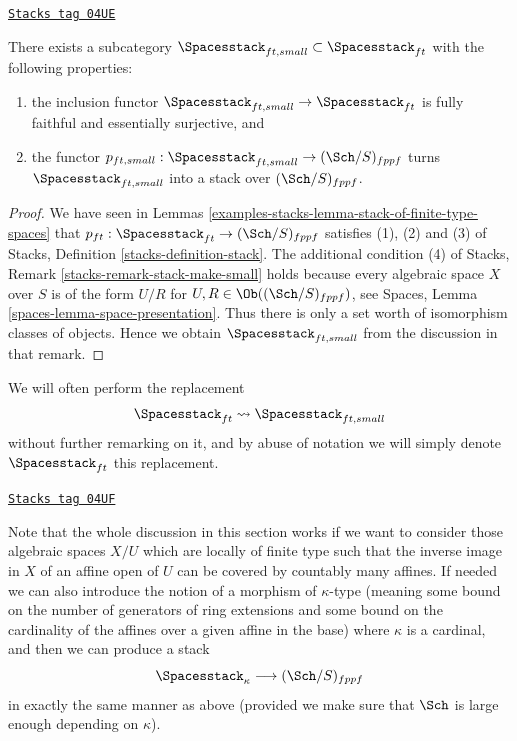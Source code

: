 \begin{lemma}
\label{examples-stacks-lemma-stack-ft-spaces}
\href{https://stacks.math.columbia.edu/tag/04UE}{\texttt{Stacks tag 04UE}}

There exists a subcategory
$\Spacesstack_{ft, small} \subset \Spacesstack_{ft}$
with the following properties:
\begin{enumerate}
\item the inclusion functor
$\Spacesstack_{ft, small} \to \Spacesstack_{ft}$ is
fully faithful and essentially surjective, and
\item the functor
$p_{ft, small} : \Spacesstack_{ft, small} \to (\Sch/S)_{fppf}$
turns $\Spacesstack_{ft, small}$ into a stack over
$(\Sch/S)_{fppf}$.
\end{enumerate}
\end{lemma}

\begin{proof}
We have seen in
Lemmas \ref{examples-stacks-lemma-stack-of-finite-type-spaces}
that $p_{ft} : \Spacesstack_{ft} \to (\Sch/S)_{fppf}$
satisfies (1), (2) and (3) of
Stacks, Definition \ref{stacks-definition-stack}.
The additional condition (4) of
Stacks, Remark \ref{stacks-remark-stack-make-small}
holds because every algebraic space $X$ over $S$ is of the
form $U/R$ for $U, R \in \Ob((\Sch/S)_{fppf})$, see
Spaces, Lemma \ref{spaces-lemma-space-presentation}.
Thus there is only a set worth of isomorphism classes of objects.
Hence we obtain $\Spacesstack_{ft, small}$ from the discussion
in that remark.
\end{proof}

We will often perform the replacement
$$
\Spacesstack_{ft} \leadsto \Spacesstack_{ft, small}
$$
without further remarking on it, and by abuse of notation we will
simply denote $\Spacesstack_{ft}$ this replacement.

\begin{remark}
\label{examples-stacks-remark-higher-cardinality-spaces}
\href{https://stacks.math.columbia.edu/tag/04UF}{\texttt{Stacks tag 04UF}}

Note that the whole discussion in this section works
if we want to consider those algebraic spaces $X/U$ which are
locally of finite type such that the inverse image in $X$ of an affine open
of $U$ can be covered by countably many affines.
If needed we can also introduce the notion of a morphism of
$\kappa$-type (meaning some bound on the number of generators of
ring extensions and some bound on the cardinality of the affines over
a given affine in the base) where $\kappa$ is a cardinal, and then
we can produce a stack
$$
\Spacesstack_\kappa \longrightarrow (\Sch/S)_{fppf}
$$
in exactly the same manner as above (provided we make sure that
$\Sch$ is large enough depending on $\kappa$).
\end{remark}

